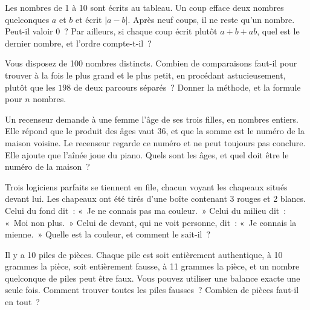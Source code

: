 \begin{question}\label{iq:iv1:logic-riddles:20}
Les nombres de 1 à 10 sont écrits au tableau. Un coup efface deux nombres quelconques $a$ et $b$ et écrit $|a - b|$. Après neuf coups, il ne reste qu'un nombre. Peut-il valoir 0~? Par ailleurs, si chaque coup écrit plutôt $a + b + ab$, quel est le dernier nombre, et l'ordre compte-t-il~?
\end{question}

\begin{question}\label{iq:iv1:logic-riddles:21}
Vous disposez de 100 nombres distincts. Combien de comparaisons faut-il pour trouver à la fois le plus grand et le plus petit, en procédant astucieusement, plutôt que les $198$ de deux parcours séparés~? Donner la méthode, et la formule pour $n$ nombres.
\end{question}

\begin{question}\label{iq:iv1:logic-riddles:22}
Un recenseur demande à une femme l'âge de ses trois filles, en nombres entiers. Elle répond que le produit des âges vaut 36, et que la somme est le numéro de la maison voisine. Le recenseur regarde ce numéro et ne peut toujours pas conclure. Elle ajoute que l'aînée joue du piano. Quels sont les âges, et quel doit être le numéro de la maison~?
\end{question}

\begin{question}\label{iq:iv1:logic-riddles:23}
Trois logiciens parfaits se tiennent en file, chacun voyant les chapeaux situés devant lui. Les chapeaux ont été tirés d'une boîte contenant 3 rouges et 2 blancs. Celui du fond dit~: «~Je ne connais pas ma couleur.~» Celui du milieu dit~: «~Moi non plus.~» Celui de devant, qui ne voit personne, dit~: «~Je connais la mienne.~» Quelle est la couleur, et comment le sait-il~?
\end{question}

\begin{question}\label{iq:iv1:logic-riddles:24}
Il y a 10 piles de pièces. Chaque pile est soit entièrement authentique, à 10 grammes la pièce, soit entièrement fausse, à 11 grammes la pièce, et un nombre quelconque de piles peut être faux. Vous pouvez utiliser une balance exacte une seule fois. Comment trouver toutes les piles fausses~? Combien de pièces faut-il en tout~?
\end{question}

